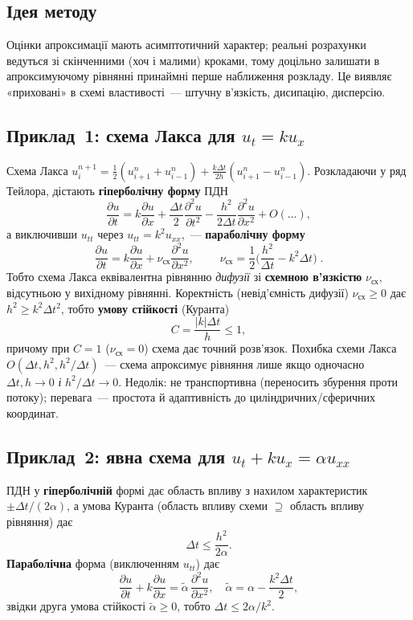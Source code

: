 \documentclass[12pt,a4paper]{article}
\theoremstyle{definition}
\theoremstyle{plain}
\newcommand{\dd}[2]{\dfrac{\partial #1}{\partial #2}}
\newcommand{\ddt}[1]{\dfrac{\partial #1}{\partial t}}
\newcommand{\ddx}[1]{\dfrac{\partial #1}{\partial x}}
\newcommand{\ddxx}[1]{\dfrac{\partial^2 #1}{\partial x^2}}
\newcommand{\abs}[1]{\left\lvert #1 \right\rvert}
\begin{document}
\subsection{Ідея методу}
Оцінки апроксимації мають асимптотичний характер; реальні розрахунки
ведуться зі скінченними (хоч і малими) кроками, тому доцільно залишати
в апроксимуючому рівнянні принаймні перше наближення розкладу. Це
виявляє «приховані» в схемі властивості~--- штучну в'язкість, дисипацію,
дисперсію.

\subsection{Приклад~1: схема Лакса для $u_t=ku_x$}
Схема Лакса
$u_i^{n+1}=\tfrac12(u_{i+1}^n+u_{i-1}^n)+\tfrac{k\Delta t}{2h}(u_{i+1}^n-u_{i-1}^n)$.
Розкладаючи у ряд Тейлора, дістають \textbf{гіперболічну форму} ПДН
\begin{equation}
  \ddt{u}=k\ddx{u}+\frac{\Delta t}{2}\dd{^2u}{t^2}-\frac{h^2}{2\Delta t}\ddxx{u}+O(\dots),
\end{equation}
а виключивши $u_{tt}$ через $u_{tt}=k^2 u_{xx}$,~--- \textbf{параболічну
форму}
\begin{equation}
  \ddt{u}=k\ddx{u}+\nu_{\text{сх}}\ddxx{u},\qquad
  \boxed{\;\nu_{\text{сх}}=\frac12\Big(\frac{h^2}{\Delta t}-k^2\Delta t\Big)\;}.
\end{equation}
Тобто схема Лакса еквівалентна рівнянню \emph{дифузії} зі
\textbf{схемною в'язкістю} $\nu_{\text{сх}}$, відсутньою у вихідному
рівнянні. Коректність (невід'ємність дифузії) $\nu_{\text{сх}}\ge0$ дає
$h^2\ge k^2\Delta t^2$, тобто \textbf{умову стійкості} (Куранта)
\begin{equation}
  C=\frac{\abs{k}\Delta t}{h}\le1,
\end{equation}
причому при $C=1$ ($\nu_{\text{сх}}=0$) схема дає точний розв'язок.
Похибка схеми Лакса $O(\Delta t,h^2,h^2/\Delta t)$~--- схема апроксимує
рівняння лише якщо одночасно $\Delta t,h\to0$ \emph{і} $h^2/\Delta t\to0$.
Недолік: не транспортивна (переносить збурення проти потоку); перевага~---
простота й адаптивність до циліндричних/сферичних координат.

\subsection{Приклад~2: явна схема для $u_t+ku_x=\alpha u_{xx}$}
ПДН у \textbf{гіперболічній} формі дає область впливу з нахилом
характеристик $\pm\Delta t/(2\alpha)$, а умова Куранта (область впливу
схеми $\supseteq$ область впливу рівняння) дає
\begin{equation}
  \Delta t\le\frac{h^2}{2\alpha}.
\end{equation}
\textbf{Параболічна} форма (виключенням $u_{tt}$) дає
\begin{equation}
  \ddt{u}+k\ddx{u}=\tilde\alpha\,\ddxx{u},\quad \tilde\alpha=\alpha-\frac{k^2\Delta t}{2},
\end{equation}
звідки друга умова стійкості $\tilde\alpha\ge0$, тобто
$\Delta t\le 2\alpha/k^2$.
\end{document}
